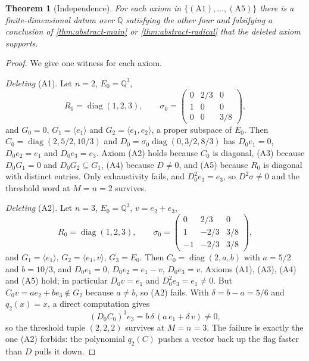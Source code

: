 \documentclass[11pt,reqno]{amsart}
\theoremstyle{plain}
\newtheorem{theorem}{Theorem}[section]
\theoremstyle{definition}
\theoremstyle{remark}
\numberwithin{equation}{section}
\begin{document}
\begin{theorem}[Independence]
\label{thm:independence}
For each axiom in $\{\mathrm{(A1)},\dots,\mathrm{(A5)}\}$ there is a
finite-dimensional datum over $\mathbb{Q}$ satisfying the other four and
falsifying a conclusion of
\cref{thm:abstract-main} or \cref{thm:abstract-radical} that the deleted axiom
supports.
\end{theorem}

\begin{proof}
We give one witness for each axiom.

\emph{Deleting} (A1). Let $n=2$, $E_{0}=\mathbb{Q}^{3}$,
\begin{equation*}
  R_{0}=\operatorname{diag}(1,2,3),
  \qquad
  \sigma_{0}=\begin{pmatrix}0&2/3&0\\1&0&0\\0&0&3/8\end{pmatrix},
\end{equation*}
and $G_{0}=0$, $G_{1}=\langle e_{1}\rangle$ and
$G_{2}=\langle e_{1},e_{2}\rangle$, a proper subspace of $E_{0}$. Then
$C_{0}=\operatorname{diag}(2,5/2,10/3)$ and
$D_{0}=\sigma_{0}\operatorname{diag}(0,3/2,8/3)$ has $D_{0}e_{1}=0$,
$D_{0}e_{2}=e_{1}$ and $D_{0}e_{3}=e_{3}$. Axiom (A2) holds because $C_{0}$ is
diagonal, (A3) because $D_{0}G_{1}=0$ and $D_{0}G_{2}\subseteq G_{1}$, (A4)
because $D\ne0$, and (A5) because $R_{0}$ is diagonal with distinct entries.
Only exhaustivity fails, and $D_{0}^{2}e_{3}=e_{3}$, so $D^{2}\sigma\ne0$ and
the threshold word at $M=n=2$ survives.

\emph{Deleting} (A2). Let $n=3$, $E_{0}=\mathbb{Q}^{3}$, $v=e_{2}+e_{3}$,
\begin{equation*}
  R_{0}=\operatorname{diag}(1,2,3),
  \qquad
  \sigma_{0}=\begin{pmatrix}0&2/3&0\\1&-2/3&3/8\\-1&-2/3&3/8\end{pmatrix},
\end{equation*}
and $G_{1}=\langle e_{1}\rangle$, $G_{2}=\langle e_{1},v\rangle$,
$G_{3}=E_{0}$. Then $C_{0}=\operatorname{diag}(2,a,b)$ with $a=5/2$ and
$b=10/3$, and $D_{0}e_{1}=0$, $D_{0}e_{2}=e_{1}-v$, $D_{0}e_{3}=v$. Axioms
(A1), (A3), (A4) and (A5) hold; in particular $D_{0}v=e_{1}$ and
$D_{0}^{2}e_{3}=e_{1}\ne0$. But $C_{0}v=ae_{2}+be_{3}\notin G_{2}$ because
$a\ne b$, so (A2) fails. With $\delta=b-a=5/6$ and $q_{2}(x)=x$, a direct
computation gives
\begin{equation*}
  (D_{0}C_{0})^{3}e_{3}=b\,\delta\,(a\,e_{1}+\delta\,v)\ne0,
\end{equation*}
so the threshold tuple $(2,2,2)$ survives at $M=n=3$. The failure is exactly
the one (A2) forbids: the polynomial $q_{2}(C)$ pushes a vector back up the
flag faster than $D$ pulls it down.


\end{proof}
\end{document}
